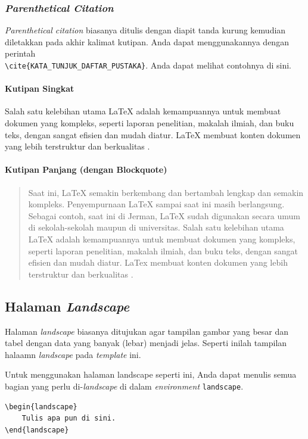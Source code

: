 \subsubsection{\textit{Parenthetical Citation}}

\textit{Parenthetical citation} biasanya ditulis dengan diapit tanda kurung kemudian diletakkan pada akhir kalimat kutipan. Anda dapat menggunakannya dengan perintah \\ \verb|\cite{KATA_TUNJUK_DAFTAR_PUSTAKA}|. Anda dapat melihat contohnya di sini.

\paragraph{Kutipan Singkat}

Salah satu kelebihan utama LaTeX adalah kemampuannya untuk membuat dokumen yang kompleks, seperti laporan penelitian, makalah ilmiah, dan buku teks, dengan sangat efisien dan mudah diatur. LaTeX membuat konten dokumen yang lebih terstruktur dan berkualitas \cite{fitriani-2024:pelatihan-latex}.

\paragraph{Kutipan Panjang (dengan Blockquote)}

\begin{quote}
    Saat ini, LaTeX semakin berkembang dan bertambah lengkap dan semakin kompleks. Penyempurnaan LaTeX sampai saat ini masih berlangsung. Sebagai contoh, saat ini di Jerman, LaTeX sudah digunakan secara umum di sekolah-sekolah maupun di universitas. Salah satu kelebihan utama LaTeX adalah kemampuannya untuk membuat dokumen yang kompleks, seperti laporan penelitian, makalah ilmiah, dan buku teks, dengan sangat efisien dan mudah diatur. LaTex membuat konten dokumen yang lebih terstruktur dan berkualitas \cite{fitriani-2024:pelatihan-latex}.
\end{quote}


\begin{landscape}
    \subsection{Halaman \textit{Landscape}}
    
    Halaman \textit{landscape} biasanya ditujukan agar tampilan gambar yang besar dan tabel dengan data yang banyak (lebar) menjadi jelas. Seperti inilah tampilan halaamn \textit{landscape} pada \textit{template} ini.
    
    Untuk menggunakan halaman landscape seperti ini, Anda dapat menulis semua bagian yang perlu di-\textit{landscape} di dalam \textit{environment} \verb|landscape|.
    
    \begin{lstlisting}
\begin{landscape}
    Tulis apa pun di sini.
\end{landscape}
    \end{lstlisting}
\end{landscape}


